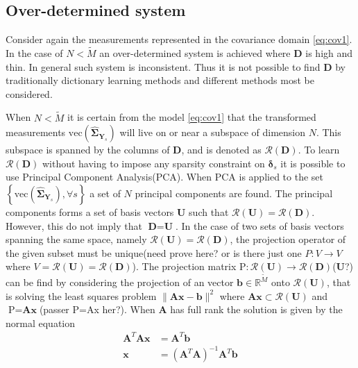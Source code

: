 \subsection{Over-determined system}\label{sec:over_det}
Consider again the measurements represented in the covariance domain \eqref{eq:cov1}.
In the case of $N < \widetilde{M}$ an over-determined system is achieved where $\textbf{D}$ is high and thin. In general such system is inconsistent. Thus it is not possible to find $\textbf{D}$ by traditionally dictionary learning methods and different methods most be considered.

When $N < \widetilde{M}$ it is certain from the model \eqref{eq:cov1} that the transformed measurements $\text{vec}(\widehat{\boldsymbol{\Sigma}}_{\textbf{Y}_s})$ will live on or near a subspace of dimension $N$. 
This subspace is spanned by the columns of $\textbf{D}$, and is denoted as $\mathcal{R}(\textbf{D})$. 
To learn $\mathcal{R}(\textbf{D})$ without having to impose any sparsity constraint on $\boldsymbol{\delta}_s$ it is possible to use Principal Component Analysis(PCA). 
When PCA is applied to the set $\left\{\text{vec}(\widehat{\boldsymbol{\Sigma}}_{\textbf{Y}_s}), \forall s \right\}$ a set of $N$ principal components are found. The principal components forms a set of basis vectors $\textbf{U}$ such that $\mathcal{R}(\textbf{U})=\mathcal{R}(\textbf{D})$. 
However, this do not imply that $\textbf{D}=\textbf{U}$. 
In the case of two sets of basis vectors spanning the same space, namely $\mathcal{R}(\textbf{U})=\mathcal{R}(\textbf{D})$, the projection operator of the given subset must be unique(need prove here? or is there just one $P:V\rightarrow V $ where $V = \mathcal{R}(\textbf{U})= \mathcal{R}(\textbf{D})$). 
The projection matrix $\text{P}:\mathcal{R}(\textbf{U})\rightarrow \mathcal{R}(\textbf{D})$($\textbf{U}$?) can be find by considering the projection of an vector $\textbf{b}\in \mathbb{R}^{\widetilde{M}}$ onto $\mathcal{R}(\textbf{U})$, that is solving the least squares problem $\| \textbf{Ax}-\textbf{b}\|^{2}$ where $\textbf{Ax}\subset \mathcal{R}(\textbf{U})$ and $\text{P} = \textbf{Ax}$(passer P=Ax her?). When $\textbf{A}$ has full rank the solution is given by the normal equation
\begin{align*}
\textbf{A}^T\textbf{A}\textbf{x} &= \textbf{A}^T\textbf{b}\\
\textbf{x} &= (\textbf{A}^T\textbf{A})^{-1}\textbf{A}^T\textbf{b}
\end{align*}	
